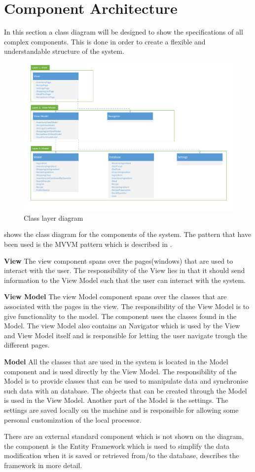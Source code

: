 \section{Component Architecture}
In this section a class diagram will be designed to show the specifications of all complex
components. This is done in order to create a flexible and understandable structure of the system.

\begin{figure}[H]
\includegraphics[width=\linewidth]{Grafik/FoodPlanner/ComponentDiagram}
\centering
\caption{Class layer diagram}
\label{LayerDiagram}
\end{figure}

 shows the class diagram for the components of the system. The pattern that have been
used is the MVVM pattern which is described in .

\textbf{View}
The view component spans over the pages(windows) that are used to interact with the user. The responsibility of the View lies in that it should send information to the View Model such that the user can interact with the system.

\textbf{View Model}
The view Model component spans over the classes that are associated with the pages in the view. The responsibility of the View Model is to give functionality to the model. The component uses the classes found in the Model. The view Model also contains an Navigator which is used by the View and View Model itself and is responsible for letting the user navigate trough the different pages.

\textbf{Model}
All the classes that are used in the system is located in the Model component and is used directly by the View Model. The responsibility of the Model is to provide classes that can be used to manipulate data and synchronise such data with an database. The objects that can be created through the Model is used in the View Model. Another part of the Model is the settings. The settings are saved locally on the machine and is responsible for allowing some personal customization of the local processor.

There are an external standard component which is not shown on the diagram, the component is the Entity Framework which is used to simplify the data modification when it is saved or retrieved from/to the database,  describes the framework in more detail.